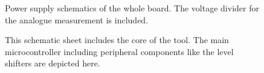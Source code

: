 \documentclass[a4paper]{report}
\begin{document}
\begin{figure}[ht] 
  \centering
  {
   \setlength{\fboxsep}{0pt}
   \setlength{\fboxrule}{0pt}
  }
  \caption{Power supply schematics of the whole board. The voltage divider for the analogue measurement is included.}
  \label{fig:power_schematic}
\end{figure}

\begin{figure}[ht] 
  \centering
  {
   \setlength{\fboxsep}{0pt}
   \setlength{\fboxrule}{0pt}
  }
  \caption{This schematic sheet includes the core of the tool. The main microcontroller including peripheral components like the level shifters are depicted here.}
  \label{fig:atxmega_schematic}
\end{figure}
\end{document}
